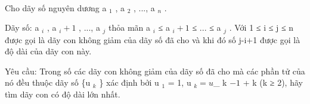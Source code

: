  

Cho dãy số nguyên dương a $_ 1 $ , a $_ 2 $ , ..., a $_ n $ .

Dãy số: a $_ i $ , a $_ i+1 $ , ..., a $_ j $ thỏa mãn a $_ i $ ≤ a $_ i+1 $ ≤ ... ≤ a $_ j $ . Với 1 ≤ i ≤ j ≤ n được gọi là dãy con không giảm của dãy số đã cho và khi đó số j-i+1 được gọi là độ dài của dãy con này.

Yêu cầu: Trong số các dãy con không giảm của dãy số đã cho mà các phần tử của nó đều thuộc dãy số \{u $_ k $ \} xác định bởi u $_ 1 $ = 1, u $_ k = u $_ k $ -1 $ + k (k ≥ 2), hãy tìm dãy con có độ dài lớn nhất.